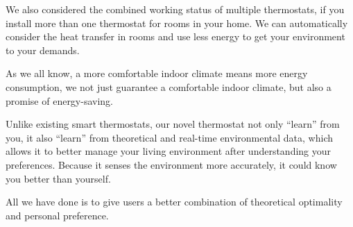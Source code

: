 \documentclass{mcmthesis}
\begin{document}
		We also considered the combined working status of multiple thermostats, if you install more than one thermostat for rooms in your home. We can automatically consider the heat transfer in rooms and use less energy to get your environment to your demands.
		
		As we all know, a more comfortable indoor climate means more energy consumption, we not just guarantee a comfortable indoor climate, but also a promise of energy-saving.
		
		Unlike existing smart thermostats, our novel thermostat not only “learn” from you, it also “learn” from theoretical and real-time environmental data, which allows it to better manage your living environment after understanding your preferences. Because it senses the environment more accurately, it could know you better than yourself.
		
		All we have done is to give users a better combination of theoretical optimality and personal preference.
		
			
		
	
	
\end{document}
